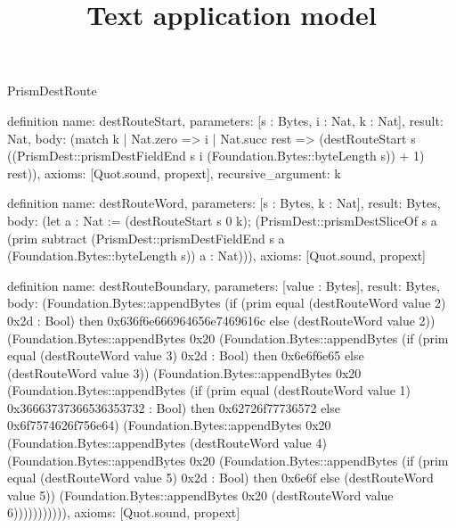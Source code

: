 \begin{lexlean}{PrismDestRoute}
\title{Text application model}
\begin{semanticmodule}
definition{
  name: destRouteStart,
  parameters: [s : Bytes, i : Nat, k : Nat],
  result: Nat,
  body: (match k
    | Nat.zero => i
    | Nat.succ rest => (destRouteStart s ((PrismDest::prismDestFieldEnd s i (Foundation.Bytes::byteLength s)) + 1) rest)),
  axioms: [Quot.sound, propext],
  recursive_argument: k
}

definition{
  name: destRouteWord,
  parameters: [s : Bytes, k : Nat],
  result: Bytes,
  body: (let a : Nat := (destRouteStart s 0 k); (PrismDest::prismDestSliceOf s a (prim subtract (PrismDest::prismDestFieldEnd s a (Foundation.Bytes::byteLength s)) a : Nat))),
  axioms: [Quot.sound, propext]
}

definition{
  name: destRouteBoundary,
  parameters: [value : Bytes],
  result: Bytes,
  body: (Foundation.Bytes::appendBytes (if (prim equal (destRouteWord value 2) 0x2d : Bool) then 0x636f6e666964656e7469616c else (destRouteWord value 2)) (Foundation.Bytes::appendBytes 0x20 (Foundation.Bytes::appendBytes (if (prim equal (destRouteWord value 3) 0x2d : Bool) then 0x6e6f6e65 else (destRouteWord value 3)) (Foundation.Bytes::appendBytes 0x20 (Foundation.Bytes::appendBytes (if (prim equal (destRouteWord value 1) 0x36663737366536353732 : Bool) then 0x62726f77736572 else 0x6f7574626f756e64) (Foundation.Bytes::appendBytes 0x20 (Foundation.Bytes::appendBytes (destRouteWord value 4) (Foundation.Bytes::appendBytes 0x20 (Foundation.Bytes::appendBytes (if (prim equal (destRouteWord value 5) 0x2d : Bool) then 0x6e6f else (destRouteWord value 5)) (Foundation.Bytes::appendBytes 0x20 (destRouteWord value 6))))))))))),
  axioms: [Quot.sound, propext]
}


\end{semanticmodule}
\end{lexlean}
